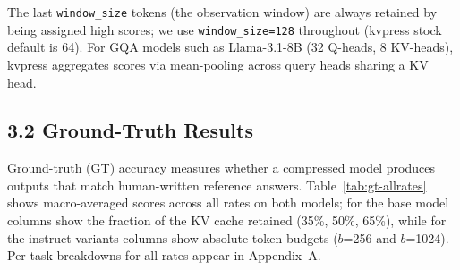 \documentclass[10pt,letterpaper]{article}
\begin{document}
The last \texttt{window\_size} tokens (the observation window) are
always retained by being assigned high scores; we use
\texttt{window\_size=128} throughout (kvpress stock default is 64). For
GQA models such as Llama-3.1-8B (32 Q-heads, 8 KV-heads), kvpress
aggregates scores via mean-pooling across query heads sharing a KV head.

\hypertarget{gt-evaluation}{%
\subsection{3.2 Ground-Truth Results}\label{gt-evaluation}}

Ground-truth (GT) accuracy measures whether a compressed model produces outputs
that match human-written reference answers. Table~\ref{tab:gt-allrates} shows macro-averaged scores
across all rates on both models; for the base model columns show the fraction of the KV cache
retained (35\%, 50\%, 65\%), while for the instruct variants columns show absolute token budgets
($b$=256 and $b$=1024). Per-task breakdowns for all rates appear in Appendix~A.
\end{document}

